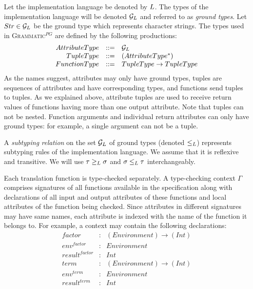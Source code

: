 \documentclass{informat} %
\newcommand{\ATF}{\textsc{Grammatic}$^{PG}$}
\begin{document}
Let the implementation language be denoted by $L$. The types of the implementation language will be denoted ${\mathcal{G}_L}$ and referred to as \emph{ground types}. Let $Str \in {\mathcal{G}_L}$ be the ground type which represents character strings. The types used in \ATF{} are defined by the following productions:
$$
\begin{array}{rcl}
	AttributeType &::=& {\mathcal{G}_L} \\
	TupleType &::=& (AttributeType^*) \\
	FunctionType &::=& TupleType \rightarrow TupleType\\
\end{array}
$$
As the names suggest, attributes may only have ground types, tuples are sequences of attributes and have corresponding types, and functions send tuples to tuples. As we explained above, attribute tuples are used to receive return values of functions having more than one output attribute. Note that tuples can not be nested. Function arguments and individual return attributes can only have ground types: for example, a single argument can not be a tuple.

A \emph{subtyping relation} on the set ${\mathcal{G}_L}$ of ground types (denoted $\le_L$) represents subtyping rules of the implementation language. We assume that it is reflexive and transitive. We will use $\tau \ge_L \sigma$ and $\sigma \le_L \tau$ interchangeably.

Each translation function is type-checked separately. A type-checking context $\Gamma$ comprises signatures of all functions available in the specification along with declarations of all input and output attributes of these functions and local attributes of the function being checked. Since attributes in different signatures may have same names, each attribute is indexed with the name of the function it belongs to. For example, a context may contain the following declarations:\\
$$\begin{array}{rcl}
factor&:& (Environment) \rightarrow (Int)\\
env^{factor} &:& Environment\\
result^{factor} &:& Int\\
term &:& (Environment) \rightarrow (Int)\\
env^{term} &:& Environment\\
result^{term} &:& Int\\
\end{array}$$
\end{document}
